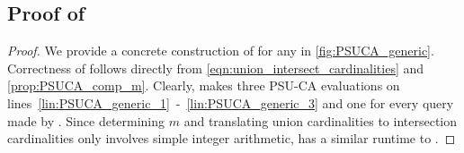 \subsection{Proof of }\label{ap:psica-to-psuca}

\begin{proof}
	We provide a concrete construction of \bdv{} for any \adv{} in \cref{fig:PSUCA_generic}.
	Correctness of \bdv{} follows directly from \cref{eqn:union_intersect_cardinalities} and \cref{prop:PSUCA_comp_m}.
	Clearly, \bdv{} makes three PSU-CA evaluations on lines~\ref{lin:PSUCA_generic_1}~-~\ref{lin:PSUCA_generic_3} and one for every \PSICA{} query made by \adv{}.
	Since determining $m$ and translating union cardinalities to intersection cardinalities only involves simple integer arithmetic, 
	\bdv{} has a similar runtime to \adv{}.
\end{proof}